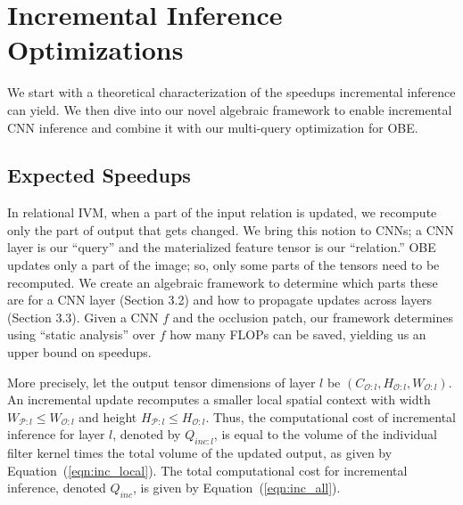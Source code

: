 \section{Incremental Inference Optimizations}\label{sec:exact}
We start with a theoretical characterization of the speedups incremental inference can yield. We then dive into our novel algebraic framework to enable incremental CNN inference and combine it with our multi-query optimization for OBE.


\vspace{-2mm}
\subsection{Expected Speedups}

In relational IVM, when a part of the input relation is updated, we recompute only the part of output that gets changed. We bring this notion to CNNs; a CNN layer is our ``query'' and the materialized feature tensor is our ``relation.'' OBE updates only a part of the image; so, only some parts of the tensors need to be recomputed. We create an algebraic framework to determine which parts these are for a CNN layer (Section 3.2) and how to propagate updates across layers (Section 3.3). Given a CNN $f$ and the occlusion patch, our framework determines using ``static analysis'' over $f$ how many FLOPs can be saved, yielding us an upper bound on speedups.

More precisely, let the output tensor dimensions of layer $l$ be $(C_{\mathcal{O}:l} , H_{\mathcal{O}:l} , W_{\mathcal{O}:l})$. An incremental update recomputes a smaller local spatial context with width $W_{\mathcal{P}:l} \le W_{\mathcal{O}:l}$ and height $H_{\mathcal{P}:l} \le H_{\mathcal{O}:l}$.
Thus, the computational cost of incremental inference for layer $l$, denoted by $Q_{\mathit{inc}:l}$, is equal to the volume of the individual filter kernel times the total volume of the updated output, as given by Equation~(\ref{eqn:inc_local}). The total computational cost for incremental inference, denoted $Q_\mathit{inc}$, is given by Equation~(\ref{eqn:inc_all}).

